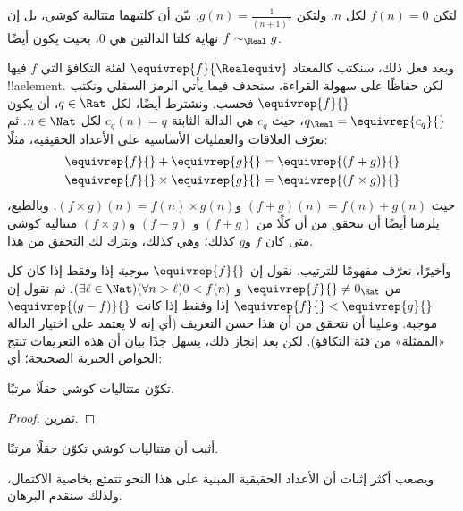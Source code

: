 \documentclass[../../../include/open-logic-section]{subfiles}
\begin{document}
\begin{prob}
لتكن $f(n) = 0$ لكل $n$. ولتكن $g(n) = \frac{1}{(n+1)^2}$. بيّن أن
كلتيهما متتالية كوشي، بل إن نهاية كلتا الدالتين هي $0$، بحيث يكون أيضًا
$f \sim_\Real g$.
\end{prob}

وبعد فعل ذلك، سنكتب كالمعتاد $\equivrep{f}{\Realequiv}$ لفئة التكافؤ
التي $f$ فيها !!a{element}. لكن حفاظًا على سهولة القراءة، سنحذف
فيما يأتي الرمز السفلي ونكتب $\equivrep{f}{}$ فحسب. ونشترط أيضًا، لكل
$q \in \Rat$، أن يكون $q_{\Real} = \equivrep{c_{q}}{}$، حيث $c_{q}$
هي الدالة الثابتة $c_q(n) = q$ لكل $n \in \Nat$. ثم نعرّف العلاقات
والعمليات الأساسية على الأعداد الحقيقية، مثلًا:
\begin{align*}
	\equivrep{f}{} + \equivrep{g}{} &= 	\equivrep{(f + g)}{} \\
	\equivrep{f}{} \times 	\equivrep{g}{} &= \equivrep{(f \times g)}{} 
\end{align*}
حيث $(f + g)(n) = f(n) + g(n)$ و$(f \times g)(n) = f(n) \times
g(n)$. وبالطبع، يلزمنا أيضًا أن نتحقق من أن كلًا من $(f + g)$ و
$(f-g)$ و$(f\times g)$ متتالية كوشي متى كان $f$ و$g$ كذلك؛ وهي كذلك،
ونترك لك التحقق من هذا.

وأخيرًا، نعرّف مفهومًا للترتيب. نقول إن $\equivrep{f}{}$
\emph{موجبة} إذا وفقط إذا كان كل من $\equivrep{f}{}\neq 0_\Rat$ و
$(\exists \ell \in \Nat)(\forall n > \ell)0 < f(n)$. ثم نقول إن
$\equivrep{f}{} < \equivrep{g}{}$ إذا وفقط إذا كانت
$\equivrep{(g - f)}{}$ موجبة. وعلينا أن نتحقق من أن هذا حسن التعريف
(أي إنه لا يعتمد على اختيار الدالة «الممثلة» من فئة التكافؤ).
لكن بعد إنجاز ذلك، يسهل جدًا بيان أن هذه التعريفات تنتج الخواص الجبرية
الصحيحة؛ أي:
\begin{thm}
تكوّن متتاليات كوشي حقلًا مرتبًا.
\end{thm}

\begin{proof}
تمرين.
\end{proof}

\begin{prob}
أثبت أن متتاليات كوشي تكوّن حقلًا مرتبًا.
\end{prob}

ويصعب أكثر إثبات أن الأعداد الحقيقية المبنية على هذا النحو تتمتع
بخاصية الاكتمال، ولذلك سنقدم البرهان.
\end{document}
